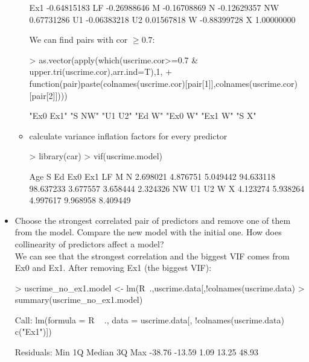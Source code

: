 \documentclass[a4paper]{article}
\begin{document}
\begin{itemize}
\begin{itemize}
\begin{Schunk}
\begin{Soutput}
Ex1 -0.64815183
LF  -0.26988646
M   -0.16708869
N   -0.12629357
NW   0.67731286
U1  -0.06383218
U2   0.01567818
W   -0.88399728
X    1.00000000
\end{Soutput}
\end{Schunk}
We can find pairs with cor $\geq 0.7$:
\begin{Schunk}
\begin{Sinput}
> as.vector(apply(which(uscrime.cor>=0.7 & upper.tri(uscrime.cor),arr.ind=T),1,
+ 				function(pair){paste(colnames(uscrime.cor)[pair[1]],colnames(uscrime.cor)[pair[2]])}))
\end{Sinput}
\begin{Soutput}
[1] "Ex0 Ex1" "S NW"    "U1 U2"   "Ed W"    "Ex0 W"   "Ex1 W"   "S X"    
\end{Soutput}
\end{Schunk}
\item calculate variance inflation factors for every predictor
\begin{Schunk}
\begin{Sinput}
> library(car)
> vif(uscrime.model)
\end{Sinput}
\begin{Soutput}
      Age         S        Ed       Ex0       Ex1        LF         M         N 
 2.698021  4.876751  5.049442 94.633118 98.637233  3.677557  3.658444  2.324326 
       NW        U1        U2         W         X 
 4.123274  5.938264  4.997617  9.968958  8.409449 
\end{Soutput}
\end{Schunk}
\end{itemize}
\item Choose the strongest correlated pair of predictors and remove one of them
from the model. Compare the new model with the initial one. How does
collinearity of predictors affect a model?\\ 
We can see that the strongest correlation and the biggest VIF comes from Ex0 and
Ex1. After removing Ex1 (the biggest VIF):
\begin{Schunk}
\begin{Sinput}
> uscrime_no_ex1.model <- lm(R~.,uscrime.data[,!colnames(uscrime.data) %in% c("Ex1")])
> summary(uscrime_no_ex1.model)	
\end{Sinput}
\begin{Soutput}
Call:
lm(formula = R ~ ., data = uscrime.data[, !colnames(uscrime.data) %in% 
    c("Ex1")])

Residuals:
   Min     1Q Median     3Q    Max 
-38.76 -13.59   1.09  13.25  48.93 


\end{Soutput}
\end{Schunk}
\end{itemize}
\end{document}
